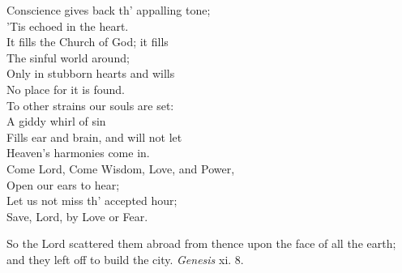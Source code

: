  Conscience gives back th’ appalling tone; \\
 ’Tis echoed in the heart. \\
  It fills the Church of God; it fills \\
 The sinful world around; \\
 Only in stubborn hearts and wills \\
 No place for it is found. \\
  To other strains our souls are set: \\
 A giddy whirl of sin \\
 Fills ear and brain, and will not let \\
 Heaven’s harmonies come in. \\
  Come Lord, Come Wisdom, Love, and Power, \\
 Open our ears to hear; \\
 Let us not miss th’ accepted hour; \\
 Save, Lord, by Love or Fear.\\


So the Lord scattered them abroad from thence upon the face of all the earth; and they left off to build the city. \emph{Genesis} xi. 8.

